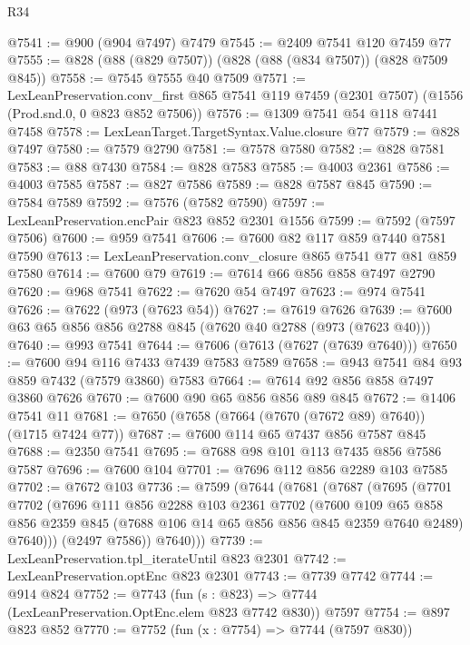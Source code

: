\begin{lexlean}{R34}
\begin{coremodule}
@7541 := @900 (@904 @7497) @7479
@7545 := @2409 @7541 @120 @7459 @77
@7555 := @828 (@88 (@829 @7507)) (@828 (@88 (@834 @7507)) (@828 @7509 @845))
@7558 := @7545 @7555 @40 @7509
@7571 := LexLeanPreservation.conv_first
    @865
    @7541
    @119
    @7459
    (@2301 @7507)
    (@1556 (Prod.snd.{0, 0} @823 @852 @7506))
@7576 := @1309 @7541 @54 @118 @7441 @7458
@7578 := LexLeanTarget.TargetSyntax.Value.closure @77
@7579 := @828 @7497
@7580 := @7579 @2790
@7581 := @7578 @7580
@7582 := @828 @7581
@7583 := @88 @7430
@7584 := @828 @7583
@7585 := @4003 @2361
@7586 := @4003 @7585
@7587 := @827 @7586
@7589 := @828 @7587 @845
@7590 := @7584 @7589
@7592 := @7576 (@7582 @7590)
@7597 := LexLeanPreservation.encPair @823 @852 @2301 @1556
@7599 := @7592 (@7597 @7506)
@7600 := @959 @7541
@7606 := @7600 @82 @117 @859 @7440 @7581 @7590
@7613 := LexLeanPreservation.conv_closure @865 @7541 @77 @81 @859 @7580
@7614 := @7600 @79
@7619 := @7614 @66 @856 @858 @7497 @2790
@7620 := @968 @7541
@7622 := @7620 @54 @7497
@7623 := @974 @7541
@7626 := @7622 (@973 (@7623 @54))
@7627 := @7619 @7626
@7639 := @7600 @63 @65 @856 @856 @2788 @845 (@7620 @40 @2788 (@973 (@7623 @40)))
@7640 := @993 @7541
@7644 := @7606 (@7613 (@7627 (@7639 @7640)))
@7650 := @7600 @94 @116 @7433 @7439 @7583 @7589
@7658 := @943 @7541 @84 @93 @859 @7432 (@7579 @3860) @7583
@7664 := @7614 @92 @856 @858 @7497 @3860 @7626
@7670 := @7600 @90 @65 @856 @856 @89 @845
@7672 := @1406 @7541 @11
@7681 := @7650 (@7658 (@7664 (@7670 (@7672 @89) @7640)) (@1715 @7424 @77))
@7687 := @7600 @114 @65 @7437 @856 @7587 @845
@7688 := @2350 @7541
@7695 := @7688 @98 @101 @113 @7435 @856 @7586 @7587
@7696 := @7600 @104
@7701 := @7696 @112 @856 @2289 @103 @7585
@7702 := @7672 @103
@7736 := @7599
    (@7644
      (@7681
        (@7687
          (@7695
            (@7701
              @7702
              (@7696
                @111
                @856
                @2288
                @103
                @2361
                @7702
                (@7600
                  @109
                  @65
                  @858
                  @856
                  @2359
                  @845
                  (@7688 @106 @14 @65 @856 @856 @845 @2359 @7640 @2489)
                  @7640)))
            (@2497 @7586))
          @7640)))
@7739 := LexLeanPreservation.tpl_iterateUntil @823 @2301
@7742 := LexLeanPreservation.optEnc @823 @2301
@7743 := @7739 @7742
@7744 := @914 @824
@7752 := @7743 (fun (s : @823) => @7744 (LexLeanPreservation.OptEnc.elem @823 @7742 @830)) @7597
@7754 := @897 @823 @852
@7770 := @7752
    (fun (x : @7754) => @7744 (@7597 @830))

\end{coremodule}
\end{lexlean}
